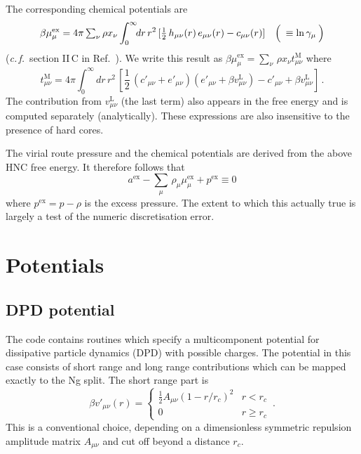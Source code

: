 \documentclass[12pt,a4paper]{article}
\newcommand{\latin}[1]{\emph{#1}}
\newcommand{\cf}{\latin{c.\,f.}}
\newcommand{\half}{{\textstyle\frac{1}{2}}}
\newcommand{\myex}{^{\mathrm{ex}}}
\newcommand{\pex}{p\myex}
\newcommand{\aex}{a\myex}
\newcommand{\muex}{\mu\myex}
\newcommand{\lr}{^{\mathrm{L}}}
\newcommand{\Refcite}[1]{Ref.~\cite{#1}}
\begin{document}
The corresponding chemical potentials are
%
\begin{equation}
\beta\muex_\mu = 4\pi\,{\textstyle \sum_{\nu}}\,\rho x_\nu 
\int_0^\infty\!\!dr\, r^2\, 
    [\half\,h_{\mu\nu}(r)\,e_{\mu\nu}(r)-c_{\mu\nu}(r)]\quad
    \Bigl(\>{}\equiv\ln\gamma_\mu\>\Bigr)
\end{equation}
%
(\cf\ section II\,C in \Refcite{Vrbka09}).  We
write this result as $\beta\muex_\mu = {\textstyle \sum_{\nu}}\,\rho x_\nu
t^{\mathrm{M}}_{\mu\nu}$ where
%
\begin{equation}
t^{\mathrm{M}}_{\mu\nu}=
4\pi \int_0^\infty\!\!dr\, r^2\, 
[\half\,(c'_{\mu\nu}+e'_{\mu\nu})(e'_{\mu\nu}+\beta v_{\mu\nu}\lr)
-c'_{\mu\nu}+\beta v_{\mu\nu}\lr]\,.
\end{equation}
%
The contribution from $v_{\mu\nu}\lr$ (the last term) also appears in
the free energy and is computed separately (analytically).  These
expressions are also insensitive to the presence of hard cores.

The virial route pressure and the chemical potentials are derived from
the above HNC free energy.  It therefore follows that
%
\begin{equation}
\aex - {\textstyle \sum_{\mu}}\,\rho_\mu \muex_\mu + \pex \equiv 0
\end{equation}
%
where $\pex=p-\rho$ is the excess pressure.  The extent to which this
actually true is largely a test of the numeric discretisation error.

\section{Potentials}
%
\subsection{DPD potential}
\label{sec:dpd}
%
The code contains routines which specify a multicomponent
potential for dissipative particle dynamics (DPD) with possible
charges.  The potential in this case consists of short range and long
range contributions which can be mapped exactly to the Ng split.  The
short range part is
%
\newcommand{\rc}{r_c}
\newcommand{\lB}{l_{\mathrm{B}}}
\begin{equation}
\beta v'_{\mu\nu}(r)=\left\{\begin{array}{ll}
\frac{1}{2}A_{\mu\nu}(1-r/\rc)^2 & r<\rc\\[3pt]
0 & r \ge \rc
\end{array}\right.\,.
\end{equation}
%
This is a conventional choice, depending on a dimensionless symmetric
repulsion amplitude matrix $A_{\mu\nu}$ and cut off beyond a
distance $\rc$.
\end{document}
